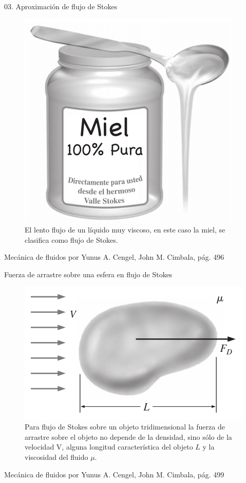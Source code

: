 
\begin{frame}{03. Aproximación de flujo de Stokes}
\justifying
\begin{figure}[H]
\centering
\includegraphics[scale=0.35]{Section_Files/S3-imagenes-Jhon/0022.png}
\caption{El lento flujo de un líquido muy viscoso, en este caso la miel, se clasifica como flujo de Stokes.}
\end{figure}
{\tiny Mecánica de fluidos por Yunus A. Cengel, John M. Cimbala, pág. 496}
\end{frame}


\begin{frame}{Fuerza de arrastre sobre una esfera en flujo de Stokes}
\justifying
\begin{figure}[H]
\centering
\includegraphics[scale=0.35]{Section_Files/S3-imagenes-Jhon/0031.png}
\caption{Para flujo de Stokes sobre un objeto tridimensional la fuerza de arrastre sobre el objeto no depende de la densidad, sino sólo de la velocidad V, alguna longitud característica del objeto $ L $ y la viscosidad del fluido $ \mu $.}
\end{figure}
{\tiny Mecánica de fluidos por Yunus A. Cengel, John M. Cimbala, pág. 499}
\end{frame}

